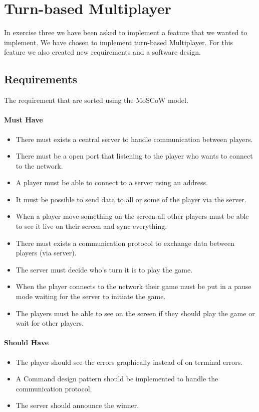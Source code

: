 \documentclass{article}
\begin{document}
\section{Turn-based Multiplayer}
In exercise three we have been asked to implement a feature that we wanted to implement. We have chosen to implement turn-based Multiplayer. For this feature we also created new requirements and a software design.

\subsection{Requirements}
The requirement that are sorted using the MoSCoW model.

\paragraph{Must Have}
\begin{itemize}
	\item There must exists a central server to handle communication between players.
	\item There must be a open port that listening to the player who wants to connect to the network.
	\item A player must be able to connect to a server using an address.
	\item It must be possible to send data to all or some of the player via the server.
	\item When a player move something on the screen all other players must be able to see it live on their screen and sync everything.
	\item There must exists a communication protocol to exchange data between players (via server).
	\item The server must decide who's turn it is to play the game.
	\item When the player connects to the network their game must be put in a pause mode waiting for the server to initiate the game.
	\item The players must be able to see on the screen if they should play the game or wait for other players.
\end{itemize}

\paragraph{Should Have}
\begin{itemize}
	\item The player should see the errors graphically instead of on terminal errors.
	\item A Command design pattern should be implemented to handle the communication protocol.
	\item The server should announce the winner.
\end{itemize}
\end{document}
